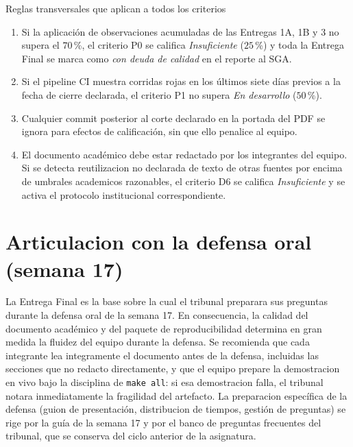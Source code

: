 \documentclass[11pt,a4paper]{article}
\begin{document}
\begin{cajacritica}{Reglas transversales que aplican a todos los criterios}
\begin{enumerate}
        \item Si la aplicaci\'{o}n de observaciones acumuladas de las Entregas 1A, 1B y 3 no supera el $70$\,\%, el criterio P0 se califica \emph{Insuficiente} ($25$\,\%) y toda la Entrega Final se marca como \emph{con deuda de calidad} en el reporte al SGA.
        \item Si el pipeline CI muestra corridas rojas en los \'{u}ltimos siete d\'{i}as previos a la fecha de cierre declarada, el criterio P1 no supera \emph{En desarrollo} ($50$\,\%).
        \item Cualquier commit posterior al corte declarado en la portada del PDF se ignora para efectos de calificaci\'{o}n, sin que ello penalice al equipo.
        \item El documento acad\'{e}mico debe estar redactado por los integrantes del equipo. Si se detecta reutilizacion no declarada de texto de otras fuentes por encima de umbrales academicos razonables, el criterio D6 se califica \emph{Insuficiente} y se activa el protocolo institucional correspondiente.
    \end{enumerate}
\end{cajacritica}

\section{Articulacion con la defensa oral (semana 17)}

La Entrega Final es la base sobre la cual el tribunal preparara sus preguntas durante la defensa oral de la semana 17. En consecuencia, la calidad del documento acad\'{e}mico y del paquete de reproducibilidad determina en gran medida la fluidez del equipo durante la defensa. Se recomienda que cada integrante lea integramente el documento antes de la defensa, incluidas las secciones que no redacto directamente, y que el equipo prepare la demostracion en vivo bajo la disciplina de \texttt{make all}: si esa demostracion falla, el tribunal notara inmediatamente la fragilidad del artefacto. La preparacion espec\'{i}fica de la defensa (guion de presentaci\'{o}n, distribucion de tiempos, gesti\'{o}n de preguntas) se rige por la gu\'{i}a de la semana 17 y por el banco de preguntas frecuentes del tribunal, que se conserva del ciclo anterior de la asignatura.



\end{document}
